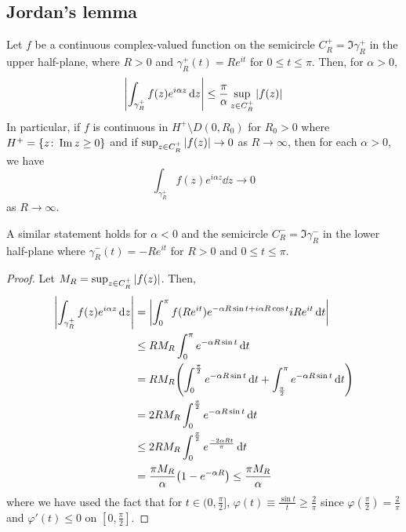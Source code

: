 \subsection{Jordan's lemma}
\begin{lemma}
	Let \( f \) be a continuous complex-valued function on the semicircle \( C_R^+ = \Im \gamma_R^+ \) in the upper half-plane, where \( R > 0 \) and \( \gamma_R^+(t) = Re^{it} \) for \( 0 \leq t \leq \pi \).
	Then, for \( \alpha > 0 \),
	\[
		\abs{\int_{\gamma_R^+} f(z) e^{i\alpha z} \dd{z}} \leq \frac{\pi}{\alpha} \sup_{z \in C_R^+} \abs{f(z)}
	\]
	In particular, if \( f \) is continuous in \( H^+ \setminus D(0,R_0) \) for \( R_0 > 0 \) where \( H^+ = \qty{z \colon \Im z \geq 0} \) and if \( \sup_{z \in C_R^+} \abs{f(z)} \to 0 \) as \( R \to \infty \), then for each \( \alpha > 0 \), we have
	\[
		\int_{\gamma_R^+} f(z) e^{i\alpha z} \dd{z} \to 0
	\]
	as \( R \to \infty \).
\end{lemma}
A similar statement holds for \( \alpha < 0 \) and the semicircle \( C_R^- = \Im \gamma_R^- \) in the lower half-plane where \( \gamma_R^-(t) = -Re^{it} \) for \( R > 0 \) and \( 0 \leq t \leq \pi \).
\begin{proof}
	Let \( M_R = \sup_{z \in C_R^+} \abs{f(z)} \).
	Then,
	\begin{align*}
		\abs{\int_{\gamma_R^+} f(z) e^{i\alpha z} \dd{z}} & = \abs{\int_0^\pi f(Re^{it}) e^{-\alpha R \sin t + i\alpha R \cos t}iRe^{it} \dd{t}}                                     \\
		                                                  & \leq RM_R \int_0^\pi e^{-\alpha R \sin t} \dd{t}                                                                         \\
		                                                  & = RM_R \qty( \int_0^{\frac{\pi}{2}} e^{-\alpha R \sin t} \dd{t} + \int_{\frac{\pi}{2}}^\pi e^{-\alpha R \sin t} \dd{t} ) \\
		                                                  & = 2RM_R \int_0^{\frac{\pi}{2}} e^{-\alpha R \sin t} \dd{t}                                                               \\
		                                                  & \leq 2 RM_R \int_0^{\frac{\pi}{2}} e^{\frac{-2\alpha R t}{\pi}} \dd{t}                                                   \\
		                                                  & = \frac{\pi M_R}{\alpha} \qty(1 - e^{-\alpha R}) \leq \frac{\pi M_R}{\alpha}
	\end{align*}
	where we have used the fact that for \( t \in (0,\frac{\pi}{2}] \), \( \varphi(t) \equiv \frac{\sin t}{t} \geq \frac{2}{\pi} \) since \( \varphi(\frac{\pi}{2}) = \frac{2}{\pi} \) and \( \varphi'(t) \leq 0 \) on \( [0,\frac{\pi}{2}] \).
\end{proof}

